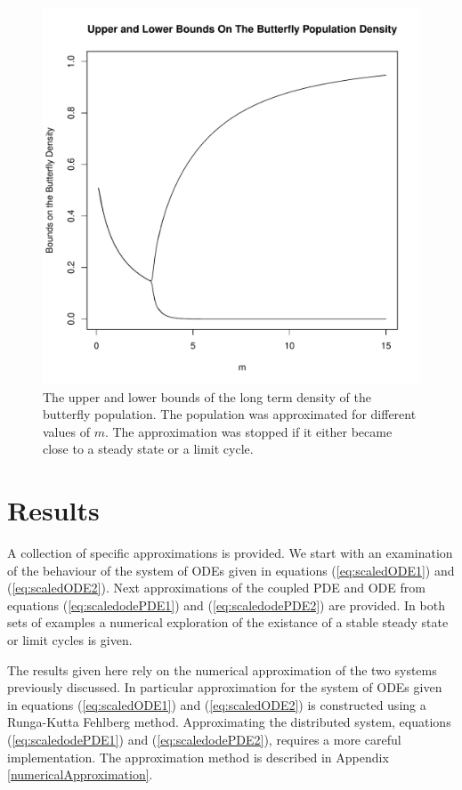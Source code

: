 \documentclass[12pt]{article}
\begin{document}
\begin{figure}[htb]
  \centering
  \includegraphics[width=12cm]{img/ODEButterflyBounds.pdf}
  \caption[Upper and lower bounds of the butterfly density.]{The upper
    and lower bounds of the long term density of the butterfly
    population. The population was approximated for different values
    of $m$. The approximation was stopped if it either became close to
    a steady state or a limit cycle.}
  \label{fig:odeButterflyBifurcation}
\end{figure}




\section{Results}
\label{section:results}

A collection of specific approximations is provided. We start with an
examination of the behaviour of the system of ODEs given in equations
(\ref{eq:scaledODE1}) and (\ref{eq:scaledODE2}). Next approximations
of the coupled PDE and ODE from equations (\ref{eq:scaledodePDE1}) and
(\ref{eq:scaledodePDE2}) are provided. In both sets of examples a
numerical exploration of the existance of a stable steady state or
limit cycles is given.

The results given here rely on the numerical approximation of the two
systems previously discussed. In particular approximation for the
system of ODEs given in equations (\ref{eq:scaledODE1}) and
(\ref{eq:scaledODE2}) is constructed using a Runga-Kutta Fehlberg
method. Approximating the distributed system, equations
(\ref{eq:scaledodePDE1}) and (\ref{eq:scaledodePDE2}), requires a more
careful implementation. The approximation method is described in
Appendix \ref{numericalApproximation}.
\end{document}
